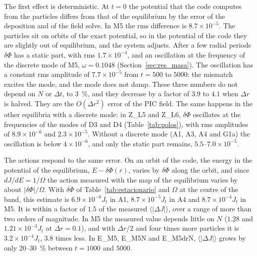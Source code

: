 \documentclass[11pt,a4paper]{article}
\begin{document}
The first effect is deterministic. At $t=0$ the potential that the code computes from the
particles differs from that of the equilibrium by the error of the deposition and of the
field solve. In M5 the rms difference is $8.7\times10^{-5}$. The particles sit on orbits of
the exact potential, so in the potential of the code they are slightly out of equilibrium,
and the system adjusts. After a few radial periods $\delta\Phi$ has a static part, with rms
$1.7\times10^{-4}$, and an oscillation at the frequency of the discrete mode of M5,
$\omega=0.1048$ (Section~\ref{sec:res_masa}). The oscillation has a constant rms amplitude of
$7.7\times10^{-5}$ from $t=500$ to $5000$: the mismatch excites the mode, and the mode does not
damp. These three numbers do not depend on $N$ or $\Delta t$, to \SI{3}{\%}, and they decrease
by a factor of $3.9$ to $4.1$ when $\Delta r$ is halved. They are the $O(\Delta r^2)$ error of
the PIC field. The same happens in the other equilibria with a discrete mode: in Z\_L5 and
Z\_L6, $\delta\Phi$ oscillates at the frequencies of the modes of D3 and D4
(Table~\ref{tab:polos}), with rms amplitudes of $8.9\times10^{-6}$ and $2.3\times10^{-5}$. Without
a discrete mode (A1, A3, A4 and G1a) the oscillation is below $4\times10^{-6}$, and only the
static part remains, $5.5$--$7.0\times10^{-5}$.

The actions respond to the same error. On an orbit of the code, the energy in the potential
of the equilibrium, $E-\delta\Phi(r)$, varies by $\delta\Phi$ along the orbit, and since
$dJ/dE=1/\Omega$ the action measured with the map of the equilibrium varies by about
$|\delta\Phi|/\Omega$. With $\overline{\delta\Phi}$ of Table~\ref{tab:estacionario} and $\Omega$ at
the centre of the band, this estimate is $6.9\times10^{-6}J_t$ in A1, $8.7\times10^{-5}J_t$ in A4
and $8.7\times10^{-4}J_t$ in M5. It is within a factor of $1.5$ of the measured
$\langle|\Delta J|\rangle$, over a range of more than two orders of magnitude. In M5 the
measured value depends little on $N$ ($1.28$ and $1.21\times10^{-3}J_t$ at $\Delta r=0.1$), and
with $\Delta r/2$ and four times more particles it is $3.2\times10^{-4}J_t$, $3.8$ times less. In
E\_M5, E\_M5N and E\_M5drN, $\langle|\Delta J|\rangle$ grows by only $20$--\SI{30}{\%} between
$t=1000$ and $5000$.
\end{document}
